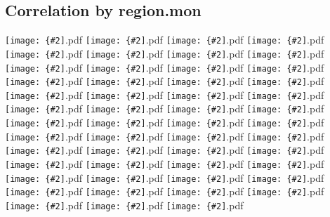 \documentclass[12pt,a4paper]{article}
\newcommand{\pdffig}[2][0.5]{\texttt{[image: \{\#2]}.pdf}}
\begin{document}
\subsection{Correlation by region.mon}
\noindent\pdffig[0.5]{Correlation_Aus_tsfc_dlwr.mon}
\pdffig[0.5]{Correlation_Aus_tsfc_dswr.mon}
\pdffig[0.5]{Correlation_Aus_tsfc_lhf.mon}
\pdffig[0.5]{Correlation_Aus_tsfc_precip.mon}
\pdffig[0.5]{Correlation_Aus_tsfc_rhum.mon}
\pdffig[0.5]{Correlation_Aus_tsfc_sfc_temp.mon}
\pdffig[0.5]{Correlation_Aus_tsfc_shf.mon}
\pdffig[0.5]{Correlation_Aus_tsfc_smc.mon}
\pdffig[0.5]{Correlation_India_tsfc_dlwr.mon}
\pdffig[0.5]{Correlation_India_tsfc_dswr.mon}
\pdffig[0.5]{Correlation_India_tsfc_lhf.mon}
\pdffig[0.5]{Correlation_India_tsfc_precip.mon}
\pdffig[0.5]{Correlation_India_tsfc_rhum.mon}
\pdffig[0.5]{Correlation_India_tsfc_sfc_temp.mon}
\pdffig[0.5]{Correlation_India_tsfc_shf.mon}
\pdffig[0.5]{Correlation_India_tsfc_smc.mon}
\pdffig[0.5]{Correlation_MC_tsfc_dlwr.mon}
\pdffig[0.5]{Correlation_MC_tsfc_dswr.mon}
\pdffig[0.5]{Correlation_MC_tsfc_lhf.mon}
\pdffig[0.5]{Correlation_MC_tsfc_precip.mon}
\pdffig[0.5]{Correlation_MC_tsfc_rhum.mon}
\pdffig[0.5]{Correlation_MC_tsfc_sfc_temp.mon}
\pdffig[0.5]{Correlation_MC_tsfc_shf.mon}
\pdffig[0.5]{Correlation_MC_tsfc_smc.mon}
\pdffig[0.5]{Correlation_NthEastAfr_tsfc_dlwr.mon}
\pdffig[0.5]{Correlation_NthEastAfr_tsfc_dswr.mon}
\pdffig[0.5]{Correlation_NthEastAfr_tsfc_lhf.mon}
\pdffig[0.5]{Correlation_NthEastAfr_tsfc_precip.mon}
\pdffig[0.5]{Correlation_NthEastAfr_tsfc_rhum.mon}
\pdffig[0.5]{Correlation_NthEastAfr_tsfc_sfc_temp.mon}
\pdffig[0.5]{Correlation_NthEastAfr_tsfc_shf.mon}
\pdffig[0.5]{Correlation_NthEastAfr_tsfc_smc.mon}
\pdffig[0.5]{Correlation_NthWestAfr_tsfc_dlwr.mon}
\pdffig[0.5]{Correlation_NthWestAfr_tsfc_dswr.mon}
\pdffig[0.5]{Correlation_NthWestAfr_tsfc_lhf.mon}
\pdffig[0.5]{Correlation_NthWestAfr_tsfc_precip.mon}
\pdffig[0.5]{Correlation_NthWestAfr_tsfc_rhum.mon}
\pdffig[0.5]{Correlation_NthWestAfr_tsfc_sfc_temp.mon}
\pdffig[0.5]{Correlation_NthWestAfr_tsfc_shf.mon}
\pdffig[0.5]{Correlation_NthWestAfr_tsfc_smc.mon}
\pdffig[0.5]{Correlation_SthAfr_tsfc_dlwr.mon}
\pdffig[0.5]{Correlation_SthAfr_tsfc_dswr.mon}
\pdffig[0.5]{Correlation_SthAfr_tsfc_lhf.mon}
\pdffig[0.5]{Correlation_SthAfr_tsfc_precip.mon}
\pdffig[0.5]{Correlation_SthAfr_tsfc_rhum.mon}
\pdffig[0.5]{Correlation_SthAfr_tsfc_sfc_temp.mon}
\pdffig[0.5]{Correlation_SthAfr_tsfc_shf.mon}
\pdffig[0.5]{Correlation_SthAfr_tsfc_smc.mon}
\pdffig[0.5]{Correlation_SthSthAm_tsfc_dlwr.mon}
\pdffig[0.5]{Correlation_SthSthAm_tsfc_dswr.mon}
\pdffig[0.5]{Correlation_SthSthAm_tsfc_lhf.mon}
\end{document}
